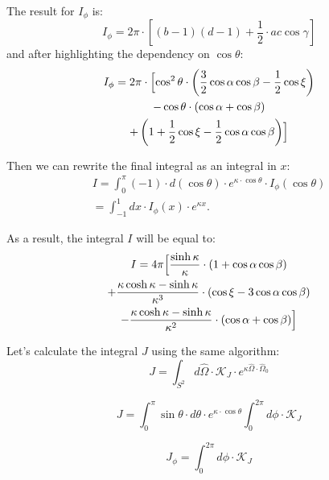 The result for $I_{\phi}$ is:
\begin{equation}
I_{\phi} = 2\pi \cdot \left[ (b-1)(d-1) + \frac{1}{2}\cdot ac \cos \gamma\right]
\end{equation}
and after highlighting the dependency on $\cos\theta$:
\begin{multline}
I_{\phi} = 2\pi \cdot \Bigl[
\cos^2 \theta \cdot \left(\frac{3}{2}\cos \alpha \cos \beta - \frac{1}{2} \cos \xi \right) \\
- \cos \theta \cdot \left(\cos \alpha + \cos \beta \right) \\ 
+ \left(1 + \frac{1}{2} \cos \xi  - \frac{1}{2} \cos \alpha \cos \beta \right) \Bigr]
\end{multline}

Then we can rewrite the final integral as an integral in $x$:
\begin{multline}
I = \int_{0}^{\pi} (-1) \cdot d(\cos \theta) \cdot e^{\kappa \cdot \cos \theta} \cdot I_{\phi}(\cos \theta) \\ 
= \int_{-1}^{1} dx \cdot I_{\phi}(x) \cdot e^{\kappa x}.
\end{multline}

As a result, the integral $I$ will be equal to:
\begin{multline}
I = 4 \pi \Bigl[\frac{\sinh\kappa}{\kappa} \cdot (1 + \cos \alpha \cos \beta) \\ + \frac{\kappa \cosh \kappa - \sinh \kappa}{\kappa^3} \cdot (\cos \xi - 3 \cos \alpha \cos \beta) \\ - \frac{\kappa \cosh \kappa - \sinh \kappa}{\kappa^2} \cdot (\cos \alpha + \cos \beta) \Bigr]
\end{multline}

Let's calculate the integral $J$ using the same algorithm:
\begin{equation*}
J = \int_{S^2} d\hat{\Omega} \cdot \mathcal{K}_{J} \cdot e^{\kappa \hat{\Omega} \cdot \hat{\Omega}_0}
\end{equation*}

\begin{equation}
J = \int_{0}^{\pi} \sin \theta \cdot d \theta \cdot e^{\kappa \cdot \cos \theta} \int_{0}^{2\pi} d \phi \cdot \mathcal{K}_{J}
\end{equation}

\begin{equation}
J_{\phi} = \int_{0}^{2\pi} d \phi \cdot \mathcal{K}_{J}
\end{equation}

